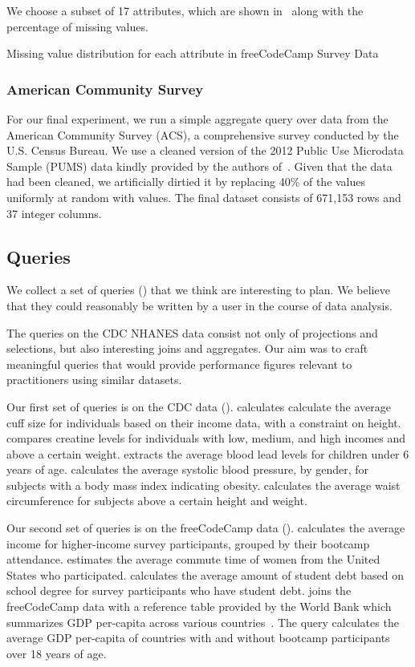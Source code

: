 We choose a subset of 17 attributes, which are shown in~ along
with the percentage of missing values.

\begin{table}
  \centering
  
  \caption{Missing value distribution for each attribute in freeCodeCamp Survey Data}\label{table:fcc-description} 
\end{table}

\subsubsection{American Community Survey}
For our final experiment, we run a simple aggregate query over data from the American
Community Survey (ACS), a comprehensive survey conducted by the U.S.
Census Bureau. We use a cleaned version of the 2012 Public Use Microdata Sample (PUMS)
data kindly provided by the authors of~\cite{akande2015empirical}. Given that the data had
been cleaned, we artificially dirtied it by replacing 40\% of the values uniformly at random with \nullv{} values.
The final dataset consists of 671,153 rows and 37 integer columns.

\subsection{Queries}
We collect a set of queries () that we think are interesting to plan.
We believe that they could reasonably be written by a user in the course of data analysis.

The queries on the CDC NHANES data consist not only of projections and selections, but also
interesting joins and aggregates. Our aim was to craft meaningful queries that would
provide performance figures relevant to practitioners using similar datasets.

Our first set of queries is on the CDC data ().
 calculates calculate the average cuff size for individuals based on their income data, with a constraint on height.
 compares creatine levels for individuals with low, medium, and high incomes and above a certain weight.
 extracts the average blood lead levels for children under 6 years of age.
 calculates the average systolic blood pressure, by gender, for subjects with a body mass index indicating obesity. 
 calculates the average waist circumference for subjects above a certain height and weight.

Our second set of queries is on the freeCodeCamp data ().
 calculates the average income for higher-income survey participants, grouped by their bootcamp attendance.
 estimates the average commute time of women from the United States who participated.
 calculates the average amount of student debt based on school degree for survey participants who have student debt.
 joins the freeCodeCamp data with a reference table provided by the World Bank which summarizes GDP per-capita across various countries~\cite{worldbank-data}.
The query calculates the average GDP per-capita of countries with and without bootcamp participants over 18 years of age.

